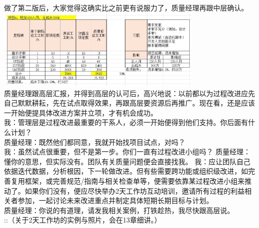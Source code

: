 做了第二版后，大家觉得这确实比之前更有说服力了，质量经理再跟中层确认。\\

\includegraphics[width=10cm]{!!JiangJingFinal2presentScreenshot_2022-09-12_092535.jpg}\\

质量经理跟高层汇报，并得到高层的认可后，高兴地说：以前都以为过程改进应先自己默默耕耘，先在试点取得效果，再跟高层要资源后再推广。现在看，还是应该一开始便提具体改进方案并立项，才有机会成功。\\
我：管理层是过程改进最重要的干系人，必须一开始便得到他们支持。你后面有什么计划？\\
质量经理：既然他们都同意，我就开始找项目试点，对吗？\\
我：虽然试点很重要，但不是第一步。你们一直有过程改进小组吗？
质量经理：懂你的意思，但实际没有。团队有关质量问题便会直接找我。
我：应让团队自己依据迭代数据，分析根因，下一轮做改进。但有些需要跨功能或组织级改进，如完善复用框架，或完善规范/指南与相关检查单等，便需要依靠某过程改进小组来推动了。如果你们没有，便应尽快举办2天工作坊互动培训，邀请所有过程的利益相关者参加，一起讨论未来改进重点并制定具体短期长期目标与计划。\\
质量经理：你说的有道理，请发我相关案例，打铁趁热，我尽快跟高层说。\\
::（关于2天工作坊的实例与照片，会在13章细讲。）

